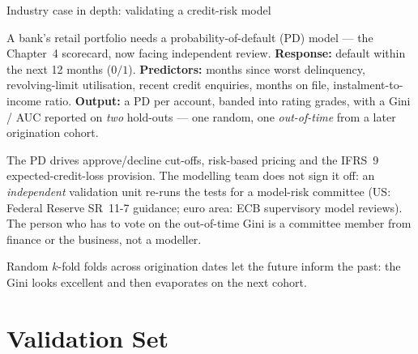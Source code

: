 \documentclass[aspectratio=169,11pt]{beamer}
\begin{document}
\begin{frame}{Industry case in depth: validating a credit-risk model}
  \footnotesize
  \begin{industry}
    A bank's retail portfolio needs a probability-of-default (PD) model
    --- the Chapter~4 scorecard, now facing independent review.
    \textbf{Response:} default within the next 12 months ($0/1$).
    \textbf{Predictors:} months since worst delinquency, revolving-limit
    utilisation, recent credit enquiries, months on file,
    instalment-to-income ratio. \textbf{Output:} a PD per account, banded
    into rating grades, with a Gini / AUC reported on \emph{two} hold-outs
    --- one random, one \emph{out-of-time} from a later origination cohort.
  \end{industry}
  \begin{readme}
    The PD drives approve/decline cut-offs, risk-based pricing and the
    IFRS~9 expected-credit-loss provision. The modelling team does not
    sign it off: an \emph{independent} validation unit re-runs the tests
    for a model-risk committee (US: Federal Reserve SR~11-7 guidance;
    euro area: ECB supervisory model reviews). The person who has to vote
    on the out-of-time Gini is a committee member from finance or the
    business, not a modeller.
  \end{readme}
  \begin{takeaway}
    Random $k$-fold folds across origination dates let the future inform
    the past: the Gini looks excellent and then evaporates on the next
    cohort.
  \end{takeaway}
\end{frame}


\section{Validation Set}
\end{document}
